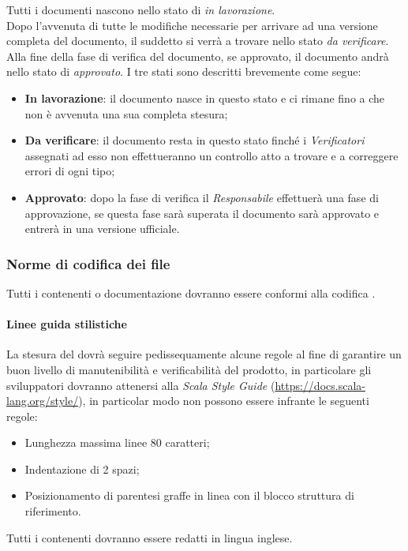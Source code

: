 \documentclass{scalatekids-article}
\begin{document}
Tutti i documenti nascono nello stato di \textit{in lavorazione}.\\
Dopo l'avvenuta di tutte le modifiche necessarie per arrivare ad una versione completa del documento, il suddetto si verrà a trovare nello stato \textit{da verificare}.\\
Alla fine della fase di verifica del documento, se approvato, il documento andrà nello stato di \textit{approvato}.
I tre stati sono descritti brevemente come segue:
\begin{itemize}
    \item \textbf{In lavorazione}: il documento nasce in questo stato e ci rimane fino a che non è avvenuta una sua completa stesura;
    \item \textbf{Da verificare}: il documento resta in questo stato finché i \textit{Verificatori} assegnati ad esso non effettueranno un controllo atto a trovare e a correggere errori di ogni tipo;
    \item \textbf{Approvato}: dopo la fase di verifica il \textit{Responsabile} effettuerà una fase di approvazione, se questa fase sarà superata il documento sarà approvato e entrerà in una versione ufficiale.
\end{itemize}

\subsubsection{Norme di codifica dei file}

Tutti i  contenenti  o documentazione dovranno essere conformi alla
codifica .

\paragraph{Linee guida stilistiche}

La stesura del  dovrà seguire pedissequamente alcune regole al fine di
garantire un buon livello di manutenibilità e verificabilità del prodotto, in
particolare gli sviluppatori dovranno attenersi alla \textit{Scala Style Guide}
(\url{https://docs.scala-lang.org/style/}), in particolar modo non possono
essere infrante le seguenti regole:
\begin{itemize}
    \item Lunghezza massima linee 80 caratteri;
    \item Indentazione di 2 spazi;
    \item Posizionamento di parentesi graffe in linea con il blocco struttura di
        riferimento.
\end{itemize}
Tutti i  contenenti  dovranno essere redatti in lingua inglese.
\end{document}
